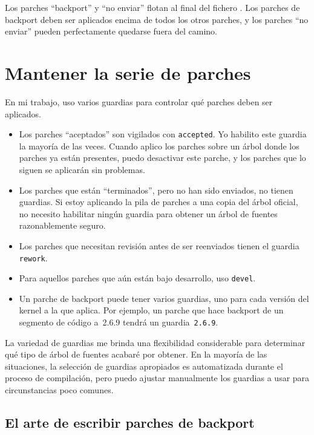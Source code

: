 Los parches ``backport'' y ``no enviar'' flotan al final del fichero
. Los parches de backport deben ser aplicados encima
de todos los otros parches, y los parches ``no enviar'' pueden
perfectamente quedarse fuera del camino.

\section{Mantener la serie de parches}

En mi trabajo, uso varios guardias para controlar qué parches deben
ser aplicados.

\begin{itemize}
\item Los parches ``aceptados'' son vigilados con
  \texttt{accepted}. Yo habilito este guardia la mayoría de las veces.
  Cuando aplico los parches sobre un árbol donde los parches ya están
  presentes, puedo desactivar este parche, y los parches que lo siguen
  se aplicarán sin problemas.
\item Los parches que están ``terminados'', pero no han sido enviados,
  no tienen guardias. Si estoy aplicando la pila de parches a una
  copia del árbol oficial, no necesito habilitar ningún guardia para
  obtener un árbol de fuentes razonablemente seguro.
\item Los parches que necesitan revisión antes de ser reenviados
  tienen el guardia \texttt{rework}.
\item Para aquellos parches que aún están bajo desarrollo, uso
  \texttt{devel}.
\item Un parche de backport puede tener varios guardias, uno para cada
  versión del kernel a la que aplica. Por ejemplo, un parche que hace
  backport de un segmento de código a~2.6.9 tendrá un guardia~\texttt{2.6.9}.
\end{itemize}
La variedad de guardias me brinda una flexibilidad considerable para
determinar qué tipo de árbol de fuentes acabaré por obtener. En la
mayoría de las situaciones, la selección de guardias apropiados es
automatizada durante el proceso de compilación, pero puedo ajustar
manualmente los guardias a usar para circunstancias poco comunes.

\subsection{El arte de escribir parches de backport}

